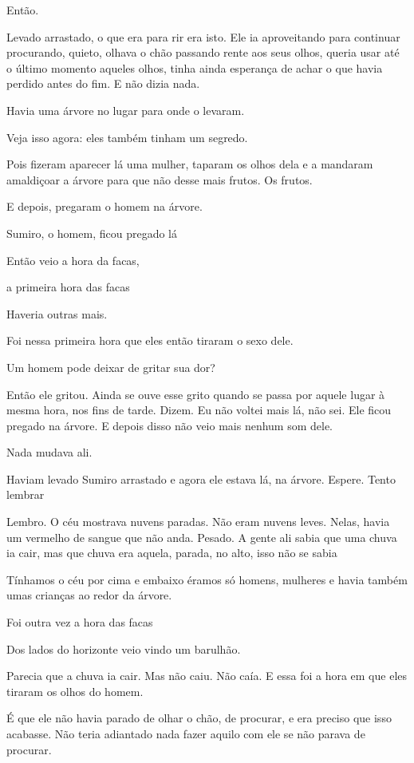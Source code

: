 Então.

Levado arrastado, o que era para rir era isto. Ele ia aproveitando para
continuar procurando, quieto, olhava o chão passando rente aos seus
olhos, queria usar até o último momento aqueles olhos, tinha ainda
esperança de achar o que havia perdido antes do fim. E não dizia nada.

Havia uma árvore no lugar para onde o levaram.

Veja isso agora: eles também tinham um segredo.

Pois fizeram aparecer lá uma mulher, taparam os olhos dela e a mandaram
amaldiçoar a árvore para que não desse mais frutos. Os frutos.

E depois, pregaram o homem na árvore.

Sumiro, o homem, ficou pregado lá

Então veio a hora da facas,

a primeira hora das facas

Haveria outras mais.

Foi nessa primeira hora que eles então tiraram o sexo dele.

Um homem pode deixar de gritar sua dor?

Então ele gritou. Ainda se ouve esse grito quando se passa por aquele
lugar à mesma hora, nos fins de tarde. Dizem. Eu não voltei mais lá, não
sei. Ele ficou pregado na árvore. E depois disso não veio mais nenhum
som dele.

Nada mudava ali.

Haviam levado Sumiro arrastado e agora ele estava lá, na árvore. Espere.
Tento lembrar

Lembro. O céu mostrava nuvens paradas. Não eram nuvens leves. Nelas,
havia um vermelho de sangue que não anda. Pesado. A gente ali sabia que
uma chuva ia cair, mas que chuva era aquela, parada, no alto, isso não
se sabia

Tínhamos o céu por cima e embaixo éramos só homens, mulheres e havia
também umas crianças ao redor da árvore.

Foi outra vez a hora das facas

Dos lados do horizonte veio vindo um barulhão.

Parecia que a chuva ia cair. Mas não caiu. Não caía. E essa foi a hora
em que eles tiraram os olhos do homem.

É que ele não havia parado de olhar o chão, de procurar, e era preciso
que isso acabasse. Não teria adiantado nada fazer aquilo com ele se não
parava de procurar.

